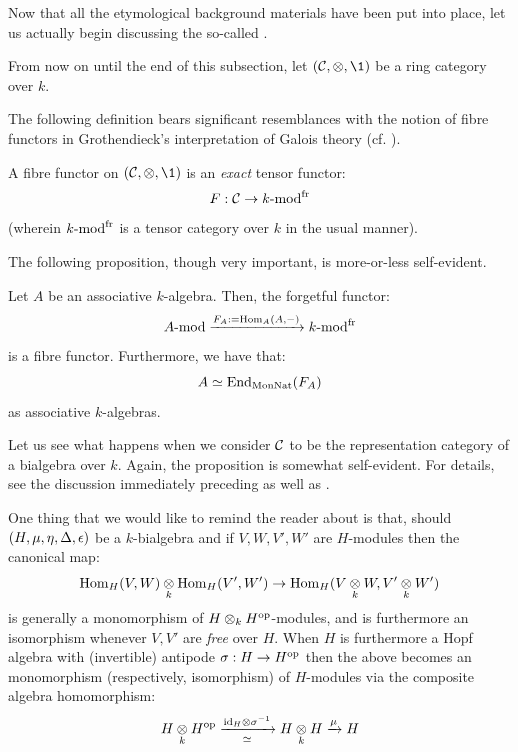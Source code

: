         Now that all the etymological background materials have been put into place, let us actually begin discussing the so-called . 
        \begin{convention}
            From now on until the end of this subsection, let $(\C, \tensor, \1)$ be a ring category over $k$. 
        \end{convention}
        The following definition bears significant resemblances with the notion of fibre functors in Grothendieck's interpretation of Galois theory (cf. \cite[Expos\'e V]{SGA1}).
        \begin{definition} \label{def: fibre_functors}
            A fibre functor on $(\C, \tensor, \1)$ is an \textit{exact} tensor functor:
                $$F: \mathcal{C} \to k\text{-}\mathrm{mod}^{\mathrm{fr}}$$
            (wherein $k\text{-}\mathrm{mod}^{\mathrm{fr}}$ is a tensor category over $k$ in the usual manner).
        \end{definition}
        The following proposition, though very important, is more-or-less self-evident. 
        \begin{proposition} \label{prop: fibre_functors_for_representation_categories_of_associative_algebras}
            Let $A$ be an associative $k$-algebra. Then, the forgetful functor:
                $$A\text{-}\mathrm{mod} \xrightarrow[]{F_A := \operatorname{Hom}_A(A, -)} k\text{-}\mathrm{mod}^{\mathrm{fr}}$$
            is a fibre functor. Furthermore, we have that:
                $$A \simeq \operatorname{End}_{\mathrm{Mon}\mathrm{Nat}}(F_A)$$
            as associative $k$-algebras. 
        \end{proposition}
        Let us see what happens when we consider $\mathcal{C}$ to be the representation category of a bialgebra over $k$. Again, the proposition is somewhat self-evident. For details, see the discussion immediately preceding \cite[Section 5.2]{EGNO} as well as \cite[Section 5.3]{EGNO}.
        \begin{remark}
            One thing that we would like to remind the reader about is that, should $(H, \mu, \eta, \Delta, \epsilon)$ be a $k$-bialgebra and if $V, W, V', W'$ are $H$-modules then the canonical map:
                $$\Hom_H(V, W) \tensor_k \Hom_H(V', W') \to \Hom_H(V \tensor_k W, V' \tensor_k W')$$
            is generally a monomorphism of $H \tensor_k H^{\op}$-modules, and is furthermore an isomorphism whenever $V, V'$ are \textit{free} over $H$. When $H$ is furthermore a Hopf algebra with (invertible) antipode $\sigma: H \to H^{\mathrm{op}}$ then the above becomes an monomorphism (respectively, isomorphism) of $H$-modules via the composite algebra homomorphism:
                $$H \tensor_k H^{\op} \xrightarrow[\cong]{\id_H \tensor \sigma^{-1}} H \tensor_k H \xrightarrow[]{\mu} H$$
        \end{remark}
